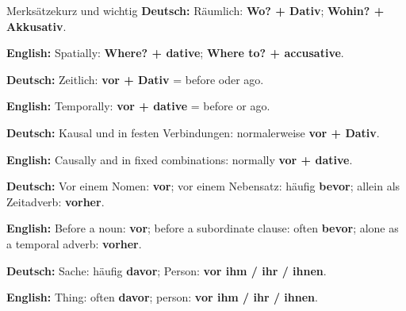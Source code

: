 \documentclass[a4paper,11pt]{article}
\newcommand{\GermanText}[1]{\textbf{Deutsch: }#1\par}
\newcommand{\EnglishText}[1]{{\small\color{SoftGray}\textbf{English: }#1\par}}
\begin{document}
        \begin{grammarentry}{Merksätze}{kurz und wichtig}
            \GermanText{Räumlich: \textbf{Wo? + Dativ}; \textbf{Wohin? + Akkusativ}.}
            \EnglishText{Spatially: \textbf{Where? + dative}; \textbf{Where to? + accusative}.}

            \GermanText{Zeitlich: \textbf{vor + Dativ} = before oder ago.}
            \EnglishText{Temporally: \textbf{vor + dative} = before or ago.}

            \GermanText{Kausal und in festen Verbindungen: normalerweise \textbf{vor + Dativ}.}
            \EnglishText{Causally and in fixed combinations: normally \textbf{vor + dative}.}

            \GermanText{Vor einem Nomen: \textbf{vor}; vor einem Nebensatz: häufig \textbf{bevor}; allein als Zeitadverb: \textbf{vorher}.}
            \EnglishText{Before a noun: \textbf{vor}; before a subordinate clause: often \textbf{bevor}; alone as a temporal adverb: \textbf{vorher}.}

            \GermanText{Sache: häufig \textbf{davor}; Person: \textbf{vor ihm / ihr / ihnen}.}
            \EnglishText{Thing: often \textbf{davor}; person: \textbf{vor ihm / ihr / ihnen}.}
        \end{grammarentry}
\end{document}
